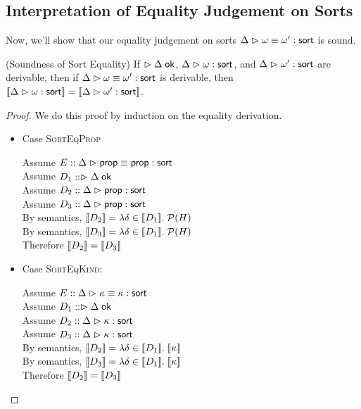 \subsection{Interpretation of Equality Judgement on Sorts}

Now, we'll show that our equality judgement on sorts ${\Delta} \vartriangleright {\omega} \equiv {\omega'} : \mathsf{sort}$ is
sound. 

\begin{lemma}{(Soundness of Sort Equality)}
If $\vartriangleright {\Delta} \;\mathsf{ok}$, ${{\Delta}} \vartriangleright {{\omega}} : {\mathsf{sort}}$, and ${{\Delta}} \vartriangleright {{\omega'}} : {\mathsf{sort}}$ are derivable, then if 
${\Delta} \vartriangleright {\omega} \equiv {\omega'} : \mathsf{sort}$ is derivable, then $[\![{{{\Delta}} \vartriangleright {{\omega}} : {\mathsf{sort}}}]\!] = [\![{{{\Delta}} \vartriangleright {{\omega'}} : {\mathsf{sort}}}]\!]$. 
\end{lemma}

\begin{proof}
We do this proof by induction on the equality derivation. 

\begin{itemize}
\item Case \textsc{SortEqProp}
  \begin{tabbedproof}
  \oo Assume $E :: {\Delta} \vartriangleright {\mathsf{prop}} \equiv {\mathsf{prop}} : \mathsf{sort}$ \\
  \oo Assume $D_1 :: \vartriangleright {\Delta} \;\mathsf{ok}$ \\
  \oo Assume $D_2 :: {{\Delta}} \vartriangleright {{\mathsf{prop}}} : {\mathsf{sort}}$ \\
  \oo Assume $D_3 :: {{\Delta}} \vartriangleright {{\mathsf{prop}}} : {\mathsf{sort}}$ \\
  \ooo By semantics, $[\![{D_2}]\!] = \lambda \delta \in [\![{D_1}]\!].\;\mathcal{P}(H)$ \\
  \ooo By semantics, $[\![{D_3}]\!] = \lambda \delta \in [\![{D_1}]\!].\;\mathcal{P}(H)$ \\
  \ooo Therefore $[\![{D_2}]\!] = [\![{D_3}]\!]$ \\
  \end{tabbedproof}

\item Case \textsc{SortEqKind}: 
  \begin{tabbedproof}
  \oo Assume $E :: {\Delta} \vartriangleright {\kappa} \equiv {\kappa} : \mathsf{sort}$ \\
  \oo Assume $D_1 :: \vartriangleright {\Delta} \;\mathsf{ok}$ \\
  \oo Assume $D_2 :: {{\Delta}} \vartriangleright {{\kappa}} : {\mathsf{sort}}$ \\
  \oo Assume $D_3 :: {{\Delta}} \vartriangleright {{\kappa}} : {\mathsf{sort}}$ \\
  \ooo By semantics, $[\![{D_2}]\!] = \lambda \delta \in [\![{D_1}]\!].\;[\![{\kappa}]\!]$ \\
  \ooo By semantics, $[\![{D_3}]\!] = \lambda \delta \in [\![{D_1}]\!].\;[\![{\kappa}]\!]$ \\
  \ooo Therefore $[\![{D_2}]\!] = [\![{D_3}]\!]$ \\
  \end{tabbedproof}


\end{itemize}
\end{proof}
